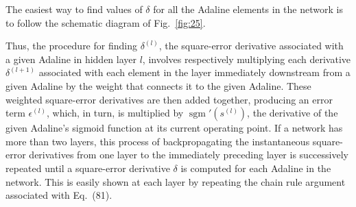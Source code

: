\documentclass[10pt,twocolumn]{article}
\newcommand{\sgm}{\operatorname{sgm}}
\begin{document}
The easiest way to find values of $\delta$ for all the Adaline elements in the
network is to follow the schematic diagram of Fig.~\ref{fig:25}.

Thus, the procedure for finding $\delta^{(l)}$, the square-error derivative
associated with a given Adaline in hidden layer $l$, involves respectively
multiplying each derivative $\delta^{(l+1)}$ associated with each element in the
layer immediately downstream from a given Adaline by the weight that connects it to
the given Adaline. These weighted square-error derivatives are then added together,
producing an error term $\epsilon^{(l)}$, which, in turn, is multiplied by
$\sgm'(s^{(l)})$, the derivative of the given Adaline's sigmoid function at its
current operating point. If a network has more than two layers, this process of
backpropagating the instantaneous square-error derivatives from one layer to the
immediately preceding layer is successively repeated until a square-error
derivative $\delta$ is computed for each Adaline in the network. This is easily
shown at each layer by repeating the chain rule argument associated with Eq.~(81).
\end{document}
